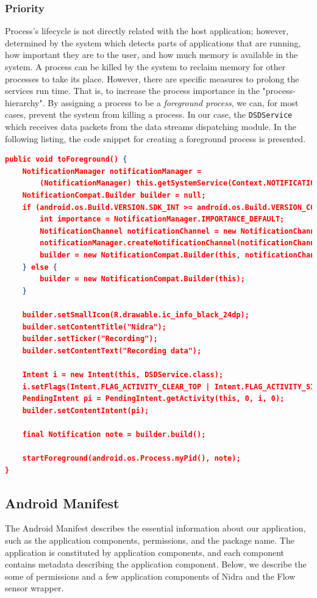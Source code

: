 \subsubsection{Priority}
Process's lifecycle is not directly related with the host application; however, determined by the system which detects parts of applications that are running, how important they are to the user, and how much memory is available in the system. A process can be killed by the system to reclaim memory for other processes to take its place. However, there are specific measures to prolong the services run time. That is, to increase the process importance in the "process-hierarchy". By assigning a process to be a \textit{foreground process}, we can, for most cases, prevent the system from killing a process. In our case, the \verb|DSDService| which receives data packets from the data streams dispatching module. In the following listing, the code snippet for creating a foreground process is presented.

\begin{lstlisting}[language=json, caption={}, captionpos=b]
public void toForeground() {
    NotificationManager notificationManager = 
        (NotificationManager) this.getSystemService(Context.NOTIFICATION_SERVICE);
    NotificationCompat.Builder builder = null;
    if (android.os.Build.VERSION.SDK_INT >= android.os.Build.VERSION_CODES.O) {
        int importance = NotificationManager.IMPORTANCE_DEFAULT;
        NotificationChannel notificationChannel = new NotificationChannel("ID", "Name", importance);
        notificationManager.createNotificationChannel(notificationChannel);
        builder = new NotificationCompat.Builder(this, notificationChannel.getId());
    } else {
        builder = new NotificationCompat.Builder(this);
    }

    builder.setSmallIcon(R.drawable.ic_info_black_24dp);
    builder.setContentTitle("Nidra");
    builder.setTicker("Recording");
    builder.setContentText("Recording data");

    Intent i = new Intent(this, DSDService.class);
    i.setFlags(Intent.FLAG_ACTIVITY_CLEAR_TOP | Intent.FLAG_ACTIVITY_SINGLE_TOP);
    PendingIntent pi = PendingIntent.getActivity(this, 0, i, 0);
    builder.setContentIntent(pi);

    final Notification note = builder.build();

    startForeground(android.os.Process.myPid(), note);
}
\end{lstlisting}

\subsection{Android Manifest} \label{impl:manifest}
The Android Manifest describes the essential information about our application, such as the application components, permissions, and the package name. The application is constituted by application components, and each component contains metadata describing the application component. Below, we describe the some of permissions and a few application components of Nidra and the Flow sensor wrapper.

